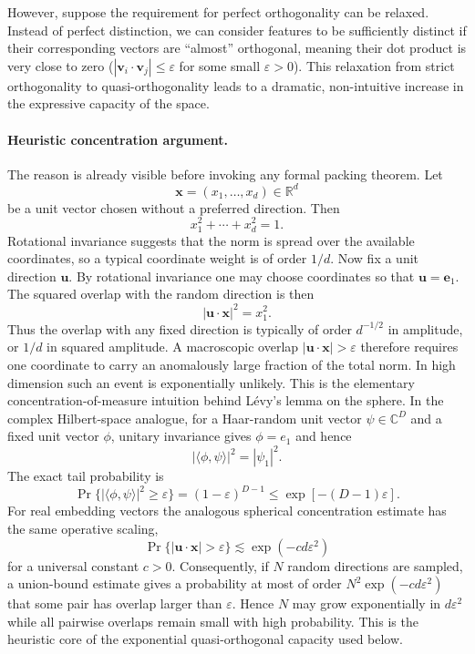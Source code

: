 \documentclass[%
  reprint,
  superscriptaddress,
  showpacs,
  showkeys,
  amsmath,amssymb,
  pra,
  longbibliography,
  floatfix,
  x11names
]{revtex4-2}
\begin{document}
However, suppose the requirement for perfect orthogonality can be relaxed.
Instead of perfect distinction, we can consider features to be sufficiently distinct if their corresponding vectors are
``almost'' orthogonal, meaning their dot product is very close to zero
($|\bm{v}_i \cdot \bm{v}_j| \le \varepsilon$ for some small $\varepsilon > 0$).
This relaxation from strict orthogonality to quasi-orthogonality leads to a dramatic,
non-intuitive increase in the expressive capacity of the space.

\paragraph*{Heuristic concentration argument.}
The reason is already visible before invoking any formal packing theorem.
Let
\[
        \bm{x}=(x_1,\ldots,x_d)\in\mathbb{R}^d
\]
be a unit vector chosen without a preferred direction.  Then
\[
        x_1^2+\cdots+x_d^2=1 .
\]
Rotational invariance suggests that the norm is spread over the available
coordinates, so a typical coordinate weight is of order $1/d$.  Now fix a unit
direction $\bm{u}$.  By rotational invariance one may choose coordinates so
that $\bm{u}=\bm{e}_1$.  The squared overlap with the random direction is
then
\[
        |\bm{u}\cdot\bm{x}|^2=x_1^2 .
\]
Thus the overlap with any fixed direction is typically of order $d^{-1/2}$ in
amplitude, or $1/d$ in squared amplitude.  A macroscopic overlap
$|\bm{u}\cdot\bm{x}|>\varepsilon$ therefore requires one coordinate to carry
an anomalously large fraction of the total norm.  In high dimension such an
event is exponentially unlikely.  This is the elementary concentration-of-measure
intuition behind L\'evy's lemma on the sphere.  In the complex Hilbert-space
analogue, for a Haar-random unit vector $\psi\in\mathbb{C}^D$ and a
fixed unit vector $\phi$, unitary invariance gives $\phi=e_1$ and hence
\[
        |\langle\phi,\psi\rangle|^2=|\psi_1|^2 .
\]
The exact tail probability is
\[
        \Pr\bigl\{|\langle\phi,\psi\rangle|^2\geq\varepsilon\bigr\}
        =(1-\varepsilon)^{D-1}
        \leq \exp[-(D-1)\varepsilon] .
\]
For real embedding vectors the analogous spherical concentration estimate has
the same operative scaling,
\[
        \Pr\bigl\{|\bm{u}\cdot\bm{x}|>\varepsilon\bigr\}
        \lesssim \exp(-c d\varepsilon^2)
\]
for a universal constant $c>0$.  Consequently, if $N$ random directions are
sampled, a union-bound estimate gives a probability at most of order
$N^2\exp(-c d\varepsilon^2)$ that some pair has overlap larger than
$\varepsilon$.  Hence $N$ may grow exponentially in $d\varepsilon^2$ while
all pairwise overlaps remain small with high probability.  This is the
heuristic core of the exponential quasi-orthogonal capacity used below.
\end{document}

